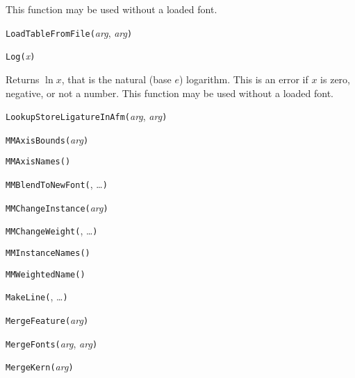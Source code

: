 This function may be used without a loaded font.


\noindent\texttt{LoadTableFromFile(}\textit{arg}, \textit{arg}\texttt{)}


\noindent\texttt{Log(}\textit{x}\texttt{)}

Returns $\ln x$, that is the natural (base $e$) logarithm.  This is an error
if $x$ is zero, negative, or not a number.
This function may be used without a loaded font.


\noindent\texttt{LookupStoreLigatureInAfm(}\textit{arg}, \textit{arg}\texttt{)}


\noindent\texttt{MMAxisBounds(}\textit{arg}\texttt{)}


\noindent\texttt{MMAxisNames(}\texttt{)}


\noindent\texttt{MMBlendToNewFont(}, \ldots\texttt{)}


\noindent\texttt{MMChangeInstance(}\textit{arg}\texttt{)}


\noindent\texttt{MMChangeWeight(}, \ldots\texttt{)}


\noindent\texttt{MMInstanceNames(}\texttt{)}


\noindent\texttt{MMWeightedName(}\texttt{)}


\noindent\texttt{MakeLine(}, \ldots\texttt{)}


\noindent\texttt{MergeFeature(}\textit{arg}\texttt{)}


\noindent\texttt{MergeFonts(}\textit{arg}, \textit{arg}\texttt{)}


\noindent\texttt{MergeKern(}\textit{arg}\texttt{)}


